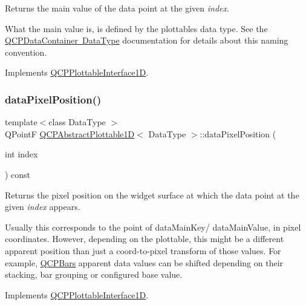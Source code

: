 Returns the main value of the data point at the given {\itshape index}.

What the main value is, is defined by the plottable\textquotesingle{}s data type. See the \mbox{\hyperlink{class_q_c_p_data_container_qcpdatacontainer-datatype}{Q\+C\+P\+Data\+Container Data\+Type}} documentation for details about this naming convention. 

Implements \mbox{\hyperlink{class_q_c_p_plottable_interface1_d_af6330919e8023277d08c958a6074fc76}{Q\+C\+P\+Plottable\+Interface1D}}.

\mbox{\label{class_q_c_p_abstract_plottable1_d_a6ca0699a6af5f25a7565de7c50ce13b2}} 
\subsubsection{\texorpdfstring{dataPixelPosition()}{dataPixelPosition()}}
{\footnotesize\ttfamily template$<$class Data\+Type $>$ \\
Q\+PointF \mbox{\hyperlink{class_q_c_p_abstract_plottable1_d}{Q\+C\+P\+Abstract\+Plottable1D}}$<$ Data\+Type $>$\+::data\+Pixel\+Position (\begin{DoxyParamCaption}\item[{int}]{index }\end{DoxyParamCaption}) const\hspace{0.3cm}{\ttfamily [virtual]}}





Returns the pixel position on the widget surface at which the data point at the given {\itshape index} appears.

Usually this corresponds to the point of data\+Main\+Key/ data\+Main\+Value, in pixel coordinates. However, depending on the plottable, this might be a different apparent position than just a coord-\/to-\/pixel transform of those values. For example, \mbox{\hyperlink{class_q_c_p_bars}{Q\+C\+P\+Bars}} apparent data values can be shifted depending on their stacking, bar grouping or configured base value. 

Implements \mbox{\hyperlink{class_q_c_p_plottable_interface1_d_a78911838cfbcfd2d8df9ad2fdbfb8e93}{Q\+C\+P\+Plottable\+Interface1D}}.



